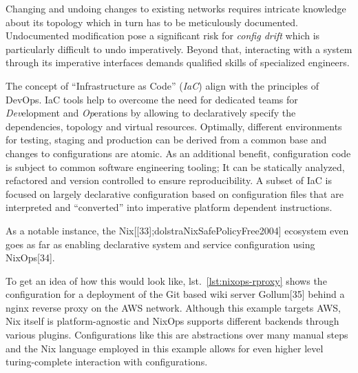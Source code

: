 \documentclass[
  a4paper,
  bibtex,
  english,
  nomenclature]{kthlatex/kththesis/kththesis}
\begin{document}
Changing and undoing changes to existing networks requires intricate
knowledge about its topology which in turn has to be meticulously
documented. Undocumented modification pose a significant risk for
\emph{config drift} which is particularly difficult to undo
imperatively. Beyond that, interacting with a system through its
imperative interfaces demands qualified skills of specialized engineers.

The concept of ``Infrastructure as Code'' (\emph{IaC}) align with the
principles of DevOps. IaC tools help to overcome the need for dedicated
teams for \emph{Dev}elopment and \emph{Op}erations by allowing to
declaratively specify the dependencies, topology and virtual resources.
Optimally, different environments for testing, staging and production
can be derived from a common base and changes to configurations are
atomic. As an additional benefit, configuration code is subject to
common software engineering tooling; It can be statically analyzed,
refactored and version controlled to ensure reproducibility. A subset of
IaC is focused on largely declarative configuration based on
configuration files that are interpreted and ``converted'' into
imperative platform dependent instructions.

As a notable instance, the
Nix{[}{[}33{]};dolstraNixSafePolicyFree2004{]} ecosystem even goes as
far as enabling declarative system and service configuration using
NixOps{[}34{]}.

To get an idea of how this would look like, lst.~\ref{lst:nixops-rproxy}
shows the configuration for a deployment of the Git based wiki server
Gollum{[}35{]} behind a nginx reverse proxy on the AWS network. Although
this example targets AWS, Nix itself is platform-agnostic and NixOps
supports different backends through various plugins. Configurations like
this are abstractions over many manual steps and the Nix language
employed in this example allows for even higher level turing-complete
interaction with configurations.
\end{document}

